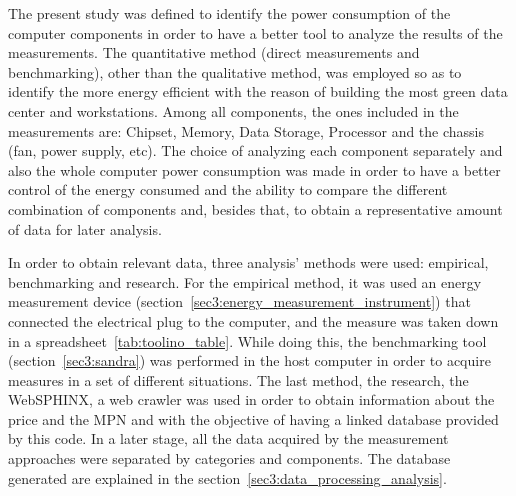     The present study was defined to identify the power consumption of the computer components in order to have a better tool to analyze the results of the measurements. The quantitative method (direct measurements and benchmarking), other than the qualitative method, was employed so as to identify the more energy efficient with the reason of building the most green data center and workstations. Among all components, the ones included in the measurements are: Chipset, Memory, Data Storage, Processor and the chassis (fan, power supply, etc).
    The choice of analyzing each component separately and also the whole computer power consumption was made in order to have a better control of the energy consumed and the ability to compare the different combination of components and, besides that, to obtain a representative amount of data for later analysis.

    In order to obtain relevant data, three analysis' methods were used: empirical, benchmarking and research. For the empirical method, it was used an energy measurement device (section~\ref{sec3:energy_measurement_instrument}) that connected the electrical plug to the computer, and the measure was taken down in a spreadsheet~\ref{tab:toolino_table}. While doing this, the benchmarking tool (section~\ref{sec3:sandra}) was performed in the host computer in order to acquire measures in a set of different situations. The last method, the research, the WebSPHINX, a web crawler was used in order to obtain information about the price and the MPN and with the objective of having a linked database provided by this code.
    In a later stage, all the data acquired by the measurement approaches were separated by categories and components. The database generated are explained in the section~\ref{sec3:data_processing_analysis}.
    
